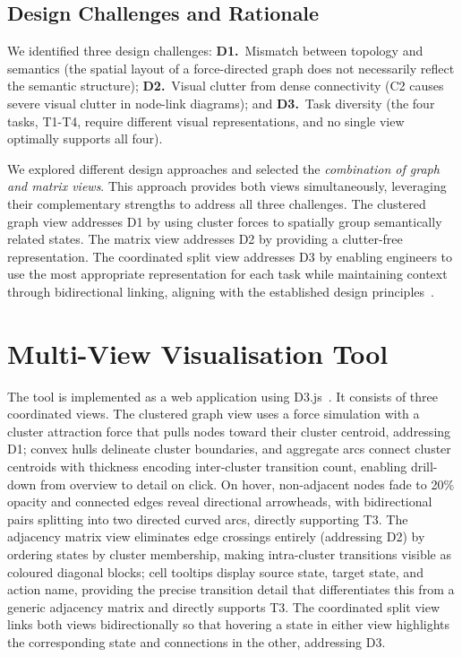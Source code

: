 \documentclass[conference]{IEEEtran}
\begin{document}
\subsection{Design Challenges and Rationale}

We identified three design challenges: \textbf{D1.}~Mismatch between topology and semantics (the spatial layout of a force-directed graph does not necessarily reflect the semantic structure); \textbf{D2.}~Visual clutter from dense connectivity (C2 causes severe visual clutter in node-link diagrams); and \textbf{D3.}~Task diversity (the four tasks, T1-T4, require different visual representations, and no single view optimally supports all four).

We explored different design approaches and selected the \textit{combination of graph and matrix views}. This approach provides both views simultaneously, leveraging their complementary strengths to address all three challenges. The clustered graph view addresses D1 by using cluster forces to spatially group semantically related states. The matrix view addresses D2 by providing a clutter-free representation. The coordinated split view addresses D3 by enabling engineers to use the most appropriate representation for each task while maintaining context through bidirectional linking, aligning with the established design principles~\cite{henry2006matrixexplorer}.

\section{Multi-View Visualisation Tool}

The tool is implemented as a web application using D3.js~\cite{bostock2011d3}. It consists of three coordinated views. The clustered graph view uses a force simulation with a cluster attraction force that pulls nodes toward their cluster centroid, addressing D1; convex hulls delineate cluster boundaries, and aggregate arcs connect cluster centroids with thickness encoding inter-cluster transition count, enabling drill-down from overview to detail on click. On hover, non-adjacent nodes fade to 20\% opacity and connected edges reveal directional arrowheads, with bidirectional pairs splitting into two directed curved arcs, directly supporting T3. The adjacency matrix view eliminates edge crossings entirely (addressing D2) by ordering states by cluster membership, making intra-cluster transitions visible as coloured diagonal blocks; cell tooltips display source state, target state, and action name, providing the precise transition detail that differentiates this from a generic adjacency matrix and directly supports T3. The coordinated split view links both views bidirectionally so that hovering a state in either view highlights the corresponding state and connections in the other, addressing D3.
 
\end{document}
